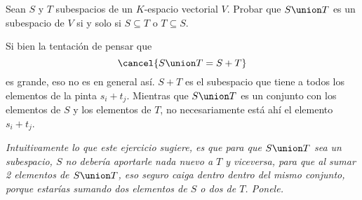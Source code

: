 \begin{enunciado}{\ejercicio}
  Sean $S$ y $T$ subespacios de un $K$-espacio vectorial $V$. Probar que $S\union T$ es un subespacio
  de $V$ si y solo si $S \subseteq T$ o $T \subseteq S$.
\end{enunciado}

Si bien la tentación de pensar que
$$
  \cancel{S \union T = S + T}
$$ es grande, eso no es en general así. $S+T$ es el subespacio que tiene a todos los elementos de la pinta $s_i + t_j$.
Mientras que $S \union T$ es un conjunto con los elementos de $S$ y los elementos de $T$, no necesariamente está ahí el elemento $s_i + t_j$.

\medskip

\textit{
  Intuitivamente lo que este ejercicio sugiere, es que para que $S \union T$ sea un subespacio, $S$ no debería aportarle nada nuevo a $T$ y viceversa,
  para que al sumar 2 elementos de $S \union T$, eso seguro caiga dentro dentro del mismo conjunto, porque estarías sumando
  dos elementos de $S$ o dos de $T$. Ponele.
}

